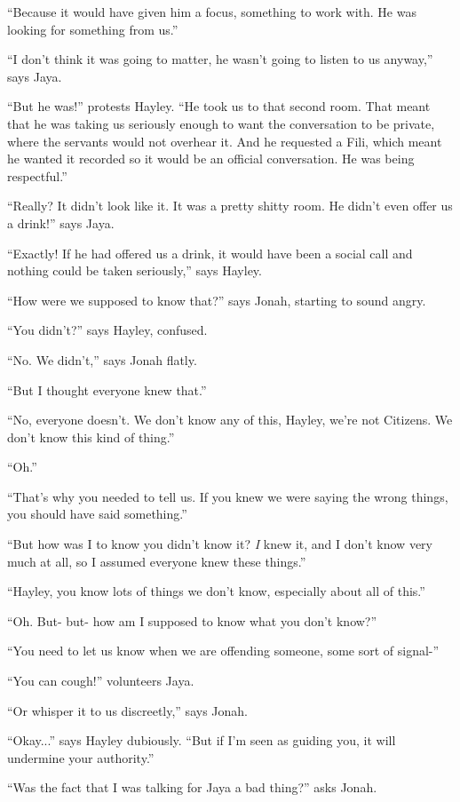 ``Because it would have given him a focus, something to work with. He was looking for something from us.''

``I don't think it was going to matter, he wasn't going to listen to us anyway,'' says Jaya.

``But he was!'' protests Hayley.  ``He took us to that second room.  That meant that he was taking us seriously enough to want the conversation to be private, where the servants would not overhear it.  And he requested a Fili, which meant he wanted it recorded so it would be an official conversation.  He was being respectful.''

``Really?  It didn't look like it.  It was a pretty shitty room.  He didn't even offer us a drink!'' says Jaya.

``Exactly!  If he had offered us a drink, it would have been a social call and nothing could be taken seriously,'' says Hayley.

``How were we supposed to know that?'' says Jonah, starting to sound angry.

``You didn't?'' says Hayley, confused.

``No.  We didn't,'' says Jonah flatly.

``But I thought everyone knew that.''

``No, everyone doesn't.  We don't know any of this, Hayley, we're not Citizens.  We don't know this kind of thing.''

``Oh.''

``That's why you needed to tell us.  If you knew we were saying the wrong things, you should have said something.''

``But how was I to know you didn't know it?  \textit{I} knew it, and I don't know very much at all, so I assumed everyone knew these things.''

``Hayley, you know lots of things we don't know, especially about all of this.''

``Oh.  But- but- how am I supposed to know what you don't know?''

``You need to let us know when we are offending someone, some sort of signal-''

``You can cough!'' volunteers Jaya.

``Or whisper it to us discreetly,'' says Jonah.

``Okay...'' says Hayley dubiously. ``But if I'm seen as guiding you, it will undermine your authority.''

``Was the fact that I was talking for Jaya a bad thing?'' asks Jonah.

